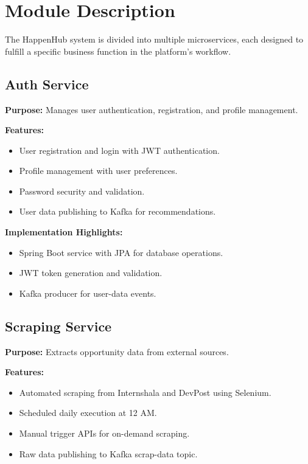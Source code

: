\documentclass[12pt,a4paper]{report}
\begin{document}
\section{Module Description}

The HappenHub system is divided into multiple microservices, each designed to
fulfill a specific business function in the platform's workflow.

\subsection{Auth Service}

\textbf{Purpose:} Manages user authentication, registration, and profile management.

\textbf{Features:}
\begin{itemize}
    \item User registration and login with JWT authentication.
    \item Profile management with user preferences.
    \item Password security and validation.
    \item User data publishing to Kafka for recommendations.
\end{itemize}

\textbf{Implementation Highlights:}
\begin{itemize}
    \item Spring Boot service with JPA for database operations.
    \item JWT token generation and validation.
    \item Kafka producer for user-data events.
\end{itemize}

\subsection{Scraping Service}

\textbf{Purpose:} Extracts opportunity data from external sources.

\textbf{Features:}
\begin{itemize}
    \item Automated scraping from Internshala and DevPost using Selenium.
    \item Scheduled daily execution at 12 AM.
    \item Manual trigger APIs for on-demand scraping.
    \item Raw data publishing to Kafka scrap-data topic.
\end{itemize}
\end{document}
